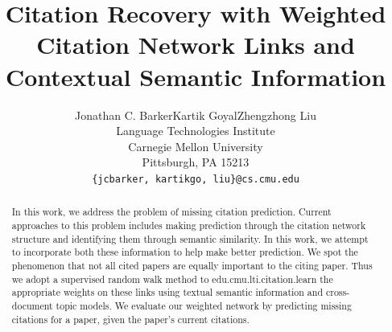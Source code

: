 \documentclass{article} %
\title{Citation Recovery with Weighted Citation Network Links and Contextual Semantic Information}
\author{
Jonathan C. Barker\tab Kartik Goyal\tab Zhengzhong Liu \\
Language Technologies Institute \\
Carnegie Mellon University \\
Pittsburgh, PA 15213 \\
\texttt{\{jcbarker, kartikgo, liu\}@cs.cmu.edu} \\
}
\begin{document}
\maketitle

\begin{abstract}
	In this work, we address the problem of missing citation prediction. Current approaches to this problem includes making prediction through the citation network structure and identifying them through semantic similarity. In this work, we attempt to incorporate both these information to help make better prediction. We spot the phenomenon that not all cited papers are equally important to the citing paper. Thus we adopt a supervised random walk method to edu.cmu.lti.citation.learn the appropriate weights on these links using textual semantic information and cross-document topic models. We evaluate our weighted network by predicting missing citations for a paper, given the paper's current citations.
\end{abstract}
\end{document}
